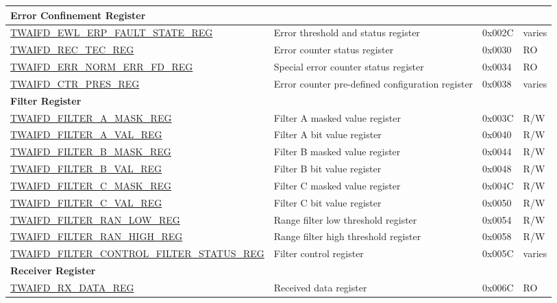\begin{longtable}{ | p{6cm} | p{7.2cm} | p{1.3cm} | p{1.5cm} | }
\multicolumn{4}{|l|}{\textbf{Error Confinement Register}} \\ \hline
\hyperref[regdesc:TWAIFDEWLERPFAULTSTATEREG]{TWAIFD\_EWL\_ERP\_FAULT\_STATE\_REG} & Error threshold and status register & 0x002C & varies \\ \hline
\hyperref[regdesc:TWAIFDRECTECREG]{TWAIFD\_REC\_TEC\_REG} & Error counter status register & 0x0030 & RO \\ \hline
\hyperref[regdesc:TWAIFDERRNORMERRFDREG]{TWAIFD\_ERR\_NORM\_ERR\_FD\_REG} & Special error counter status register & 0x0034 & RO \\ \hline
\hyperref[regdesc:TWAIFDCTRPRESREG]{TWAIFD\_CTR\_PRES\_REG} & Error counter pre-defined configuration register & 0x0038 & varies \\ \hline
\multicolumn{4}{|l|}{\textbf{Filter Register}} \\ \hline
\hyperref[regdesc:TWAIFDFILTERAMASKREG]{TWAIFD\_FILTER\_A\_MASK\_REG} & Filter A masked value register & 0x003C & R/W \\ \hline
\hyperref[regdesc:TWAIFDFILTERAVALREG]{TWAIFD\_FILTER\_A\_VAL\_REG} & Filter A bit value register & 0x0040 & R/W \\ \hline
\hyperref[regdesc:TWAIFDFILTERBMASKREG]{TWAIFD\_FILTER\_B\_MASK\_REG} & Filter B masked value register & 0x0044 & R/W \\ \hline
\hyperref[regdesc:TWAIFDFILTERBVALREG]{TWAIFD\_FILTER\_B\_VAL\_REG} & Filter B bit value register & 0x0048 & R/W \\ \hline
\hyperref[regdesc:TWAIFDFILTERCMASKREG]{TWAIFD\_FILTER\_C\_MASK\_REG} & Filter C masked value register & 0x004C & R/W \\ \hline
\hyperref[regdesc:TWAIFDFILTERCVALREG]{TWAIFD\_FILTER\_C\_VAL\_REG} & Filter C bit value register & 0x0050 & R/W \\ \hline
\hyperref[regdesc:TWAIFDFILTERRANLOWREG]{TWAIFD\_FILTER\_RAN\_LOW\_REG} & Range filter low threshold register & 0x0054 & R/W \\ \hline
\hyperref[regdesc:TWAIFDFILTERRANHIGHREG]{TWAIFD\_FILTER\_RAN\_HIGH\_REG} & Range filter high threshold register & 0x0058 & R/W \\ \hline
\hyperref[regdesc:TWAIFDFILTERCONTROLFILTERSTATUSREG]{TWAIFD\_FILTER\_CONTROL\_FILTER\newline \_STATUS\_REG} & Filter control register & 0x005C & varies \\ \hline
\multicolumn{4}{|l|}{\textbf{Receiver Register}} \\ \hline
\hyperref[regdesc:TWAIFDRXDATAREG]{TWAIFD\_RX\_DATA\_REG} & Received data register & 0x006C & RO \\ \hline

\end{longtable}
